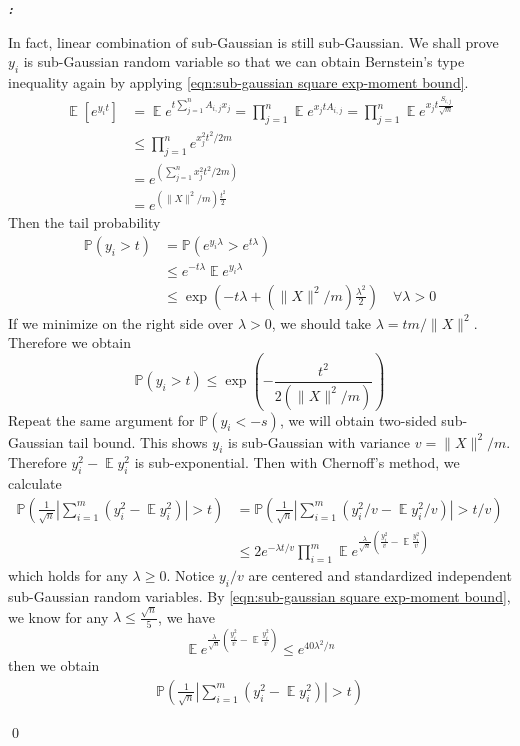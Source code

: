 \documentclass[12pt]{extarticle}
\renewenvironment{proof}[1][\proofname]{ { \it\bfseries #1: }}{\qed}
\newcommand{\field}[1]{\mathbb{#1}}
\newcommand{\1}{\field{1}}
\newcommand{\p}{\field{P}}
\DeclareMathOperator{\E}{\mathbb{E}}
\numberwithin{equation}{section}
\begin{document}
\begin{proof}
\begin{enumerate}
In fact, linear combination of sub-Gaussian is still sub-Gaussian. We shall prove $y_i$ is  sub-Gaussian random variable so that we can obtain Bernstein's type inequality again by applying \cref{eqn:sub-gaussian square exp-moment bound}. 
 \begin{align*}
   \E[e^{y_i t}] 
    & =  \E e^{ t\sum_{j=1}^n A_{i,j}x_j}    = \prod_{j=1}^n \E e^{ x_j t A_{i,j}}
    = \prod_{j=1}^n \E e^{ x_j t \frac{S_{i,j}}{\sqrt{m}} } \\
    & \le \prod_{j=1}^n e^{ {x_j^2 t^2}/{2m} } \\
  & = e^{(\sum_{j=1}^n  x_j^2 t^2/2m) } \\
  &  = e^{(\|X\|^2/m)\frac{t^2}{2}}
 \end{align*}
 Then the tail probability
 \begin{align*}
     \p(y_i>t) & = \p(e^{y_i \lambda}> e^{t\lambda}) \\
     & \le e^{-t\lambda} \E e^{y_i \lambda} \\
     & \le \exp \left(-t\lambda + (\|X\|^2/m)\frac{\lambda^2}{2} \right) \quad \forall \lambda >0
 \end{align*}
 If we minimize on the right side over $\lambda>0$, we should take $\lambda =t m/\|X\|^2$. Therefore we obtain
 \[
 \p(y_i>t) \le \exp \left(- \frac{t^2}{2(\|X\|^2/m)} \right)
 \]
 Repeat the same argument for $\p(y_i<-s)$, we will obtain two-sided sub-Gaussian tail bound.
 This shows $y_i$ is sub-Gaussian with variance $v=\|X\|^2/m $. Therefore $y_i^2-\E y_i^2$ is sub-exponential.
 Then with Chernoff's method, we calculate 
 \begin{align*}
    \p \left( \frac{1}{\sqrt{n}} \left|  \sum_{i=1}^m (y_i^2 - \E y_i^2)\right|> t  \right) 
    & = \p \left( \frac{1}{\sqrt{n}} \left|  \sum_{i=1}^m (y_i^2/v - \E y_i^2/v)\right|> t/v  \right) \\
    & \le 2 e^{-\lambda t/v} \prod_{i=1}^m \E e^{\frac{\lambda}{\sqrt{n}}(\frac{y_i^2}{v} - \E \frac{y_i^2}{v})}
 \end{align*}
which holds for any $\lambda \ge 0$. Notice $y_i/v$ are centered and standardized independent sub-Gaussian random variables. By \cref{eqn:sub-gaussian square exp-moment bound}, we know for any $\lambda \le \frac{\sqrt{n}}{5}$, we have 
\[
\E e^{\frac{\lambda}{\sqrt{n}}(\frac{y_i^2}{v} - \E \frac{y_i^2}{v})} \le   e^{ 40 \lambda^2/n }
\]
then we obtain
 \begin{align*}
    \p \left( \frac{1}{\sqrt{n}} \left|  \sum_{i=1}^m (y_i^2 - \E y_i^2)\right|> t  \right) 

\end{align*}
\end{enumerate}
\end{proof}
\end{document}
